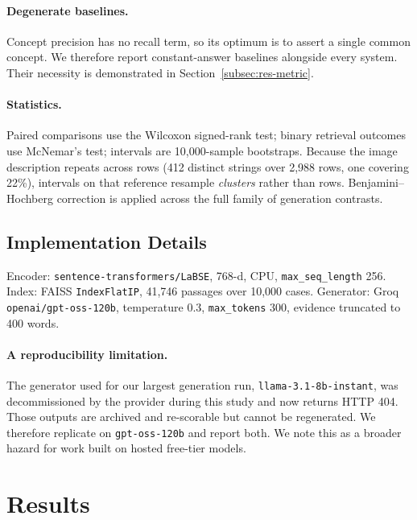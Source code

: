 \documentclass[pdflatex,sn-mathphys-num]{sn-jnl}
\theoremstyle{thmstyleone}
\theoremstyle{thmstyletwo}
\theoremstyle{thmstylethree}
\begin{document}
\paragraph{Degenerate baselines.} Concept precision has no recall term, so its optimum
is to assert a single common concept. We therefore report constant-answer baselines
alongside every system. Their necessity is demonstrated in
Section~\ref{subsec:res-metric}.

\paragraph{Statistics.} Paired comparisons use the Wilcoxon signed-rank test; binary
retrieval outcomes use McNemar's test; intervals are 10,000-sample bootstraps. Because
the image description repeats across rows (412 distinct strings over 2,988 rows, one
covering 22\%), intervals on that reference resample \emph{clusters} rather than rows.
Benjamini--Hochberg correction is applied across the full family of generation
contrasts.

\subsection{Implementation Details}\label{subsec:implementation}

Encoder: \texttt{sentence-transformers/LaBSE}, 768-d, CPU, \texttt{max\_seq\_length} 256.
Index: FAISS \texttt{IndexFlatIP}, 41,746 passages over 10,000 cases. Generator: Groq
\texttt{openai/gpt-oss-120b}, temperature 0.3, \texttt{max\_tokens} 300, evidence
truncated to 400 words.


\paragraph{A reproducibility limitation.} The generator used for our largest generation
run, \texttt{llama-3.1-8b-instant}, was decommissioned by the provider during this study
and now returns HTTP 404. Those outputs are archived and re-scorable but cannot be
regenerated. We therefore replicate on \texttt{gpt-oss-120b} and report both. We note
this as a broader hazard for work built on hosted free-tier models.

\section{Results}\label{sec:results}
\end{document}
